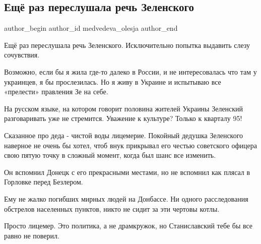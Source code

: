  
 
 
 
 
 
\subsection{Ещё раз переслушала речь Зеленского}
\label{sec:24_02_2022.tg.medvedeva_olesja.1.rech_zelenskogo}
 
\ifcmt
 author_begin
   author_id medvedeva_olesja
 author_end
\fi

Ещё раз переслушала речь Зеленского. Исключительно попытка выдавить слезу
сочувствия.

Возможно, если бы я жила где-то далеко в России, и не интересовалась что там у
украинцев, я бы прослезилась. Но я живу в Украине и испытываю все «прелести»
правления Зе на себе. 

На русском языке, на котором говорит половина жителей Украины Зеленский
разговаривать уже не стремится. Уважение к культуре? Только к кварталу 95!

Сказанное про деда - чистой воды лицемерие. Покойный дедушка Зеленского
наверное не очень бы хотел, чтоб внук прикрывал его честью советского офицера
свою пятую точку в сложный момент, когда был шанс все изменить. 

Он вспомнил Донецк с его прекрасными местами, но не вспомнил как плясал в
Горловке перед Безлером. 

Ему не жалко погибших мирных людей на Донбассе. Ни одного расследования
обстрелов населенных пунктов, никто не сидит за эти чертовы котлы. 

Просто лицемер. Это политика, а не драмкружок, но Станиславский тебе бы все
равно не поверил.
